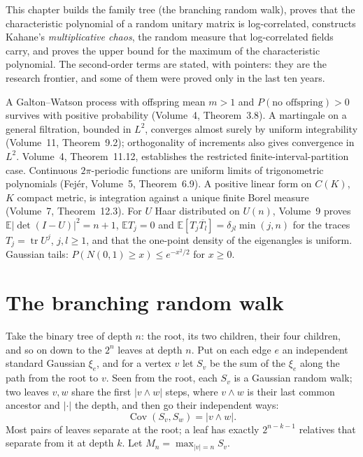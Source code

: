 This chapter builds the family tree (the branching random walk), proves that the characteristic polynomial of a random unitary matrix is log-correlated, constructs Kahane's \emph{multiplicative chaos}, the random measure that
log-correlated fields carry, and proves the upper bound for the maximum of the characteristic polynomial. The second-order terms are stated, with pointers: they are the research frontier, and some of them were proved
only in the last ten years.

\begin{reminder}
A Galton--Watson process with offspring mean $m>1$ and $P(\text{no offspring})>0$ survives with positive probability (Volume~4, Theorem~3.8). A martingale on a general filtration, bounded in $L^2$, converges almost surely by uniform integrability (Volume~11, Theorem~9.2); orthogonality of increments also gives convergence in $L^2$. Volume~4, Theorem~11.12, establishes the restricted finite-interval-partition case.
Continuous $2\pi$-periodic functions are uniform limits of trigonometric polynomials (Fej\'er, Volume~5, Theorem~6.9). A positive linear form on $C(K)$, $K$ compact metric, is integration against a unique finite Borel measure
(Volume~7, Theorem~12.3). For $U$ Haar distributed on $U(n)$, Volume~9 proves $\mathbb E|\det(I-U)|^2=n+1$, $\mathbb ET_j=0$ and $\mathbb E[T_j\overline{T_l}]=\delta_{jl}\min(j,n)$ for the traces $T_j=\operatorname{tr}U^j$, $j,l\ge1$, and that the one-point density of the eigenangles is uniform. Gaussian tails: $P(N(0,1)\ge x)\le e^{-x^2/2}$ for $x\ge0$.
\end{reminder}

\section{The branching random walk}

Take the binary tree of depth $n$: the root, its two children, their four children, and so on down to the $2^n$ leaves at depth $n$. Put on each edge $e$ an independent standard Gaussian $\xi_e$, and for a vertex $v$ let $S_v$ be the sum
of the $\xi_e$ along the path from the root to $v$. Seen from the root, each $S_v$ is a Gaussian random walk; two leaves $v,w$ share the first $|v\wedge w|$ steps, where $v\wedge w$ is their last common ancestor and $|\cdot|$ the depth, and then
go their independent ways:
\[
\operatorname{Cov}(S_v,S_w)=|v\wedge w|.
\]
Most pairs of leaves separate at the root; a leaf has exactly $2^{n-k-1}$ relatives that separate from it at depth $k$. Let $M_n=\max_{|v|=n}S_v$.

